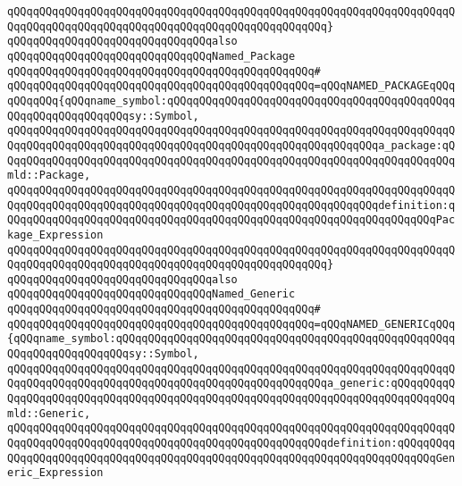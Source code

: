 \verb|qQQqqQQqqQQqqQQqqQQqqQQqqQQqqQQqqQQqqQQqqQQqqQQqqQQqqQQqqQQqqQQqqQQqqQQqqQQqqQQqqQQqqQQqqQQqqQQqqQQqqQQqqQQqqQQqqQQqqQQq}|\newline
\newline
\newline
\newline
\verb|qQQqqQQqqQQqqQQqqQQqqQQqqQQqqQQqalso|\newline
\verb|qQQqqQQqqQQqqQQqqQQqqQQqqQQqqQQqNamed_Package|\newline
\verb|qQQqqQQqqQQqqQQqqQQqqQQqqQQqqQQqqQQqqQQqqQQqqQQq#|\newline
\verb|qQQqqQQqqQQqqQQqqQQqqQQqqQQqqQQqqQQqqQQqqQQqqQQq=qQQqNAMED_PACKAGEqQQqqQQqqQQq{qQQqname_symbol:qQQqqQQqqQQqqQQqqQQqqQQqqQQqqQQqqQQqqQQqqQQqqQQqqQQqqQQqqQQqqQQqsy::Symbol,|\newline
\verb|qQQqqQQqqQQqqQQqqQQqqQQqqQQqqQQqqQQqqQQqqQQqqQQqqQQqqQQqqQQqqQQqqQQqqQQqqQQqqQQqqQQqqQQqqQQqqQQqqQQqqQQqqQQqqQQqqQQqqQQqqQQqqQQqa_package:qQQqqQQqqQQqqQQqqQQqqQQqqQQqqQQqqQQqqQQqqQQqqQQqqQQqqQQqqQQqqQQqqQQqqQQqmld::Package,|\newline
\verb|qQQqqQQqqQQqqQQqqQQqqQQqqQQqqQQqqQQqqQQqqQQqqQQqqQQqqQQqqQQqqQQqqQQqqQQqqQQqqQQqqQQqqQQqqQQqqQQqqQQqqQQqqQQqqQQqqQQqqQQqqQQqqQQqdefinition:qQQqqQQqqQQqqQQqqQQqqQQqqQQqqQQqqQQqqQQqqQQqqQQqqQQqqQQqqQQqqQQqqQQqPackage_Expression|\newline
\verb|qQQqqQQqqQQqqQQqqQQqqQQqqQQqqQQqqQQqqQQqqQQqqQQqqQQqqQQqqQQqqQQqqQQqqQQqqQQqqQQqqQQqqQQqqQQqqQQqqQQqqQQqqQQqqQQqqQQqqQQq}|\newline
\newline
\newline
\newline
\verb|qQQqqQQqqQQqqQQqqQQqqQQqqQQqqQQqalso|\newline
\verb|qQQqqQQqqQQqqQQqqQQqqQQqqQQqqQQqNamed_Generic|\newline
\verb|qQQqqQQqqQQqqQQqqQQqqQQqqQQqqQQqqQQqqQQqqQQqqQQq#|\newline
\verb|qQQqqQQqqQQqqQQqqQQqqQQqqQQqqQQqqQQqqQQqqQQqqQQq=qQQqNAMED_GENERICqQQq{qQQqname_symbol:qQQqqQQqqQQqqQQqqQQqqQQqqQQqqQQqqQQqqQQqqQQqqQQqqQQqqQQqqQQqqQQqqQQqqQQqsy::Symbol,|\newline
\verb|qQQqqQQqqQQqqQQqqQQqqQQqqQQqqQQqqQQqqQQqqQQqqQQqqQQqqQQqqQQqqQQqqQQqqQQqqQQqqQQqqQQqqQQqqQQqqQQqqQQqqQQqqQQqqQQqqQQqqQQqa_generic:qQQqqQQqqQQqqQQqqQQqqQQqqQQqqQQqqQQqqQQqqQQqqQQqqQQqqQQqqQQqqQQqqQQqqQQqqQQqqQQqmld::Generic,|\newline
\verb|qQQqqQQqqQQqqQQqqQQqqQQqqQQqqQQqqQQqqQQqqQQqqQQqqQQqqQQqqQQqqQQqqQQqqQQqqQQqqQQqqQQqqQQqqQQqqQQqqQQqqQQqqQQqqQQqqQQqqQQqdefinition:qQQqqQQqqQQqqQQqqQQqqQQqqQQqqQQqqQQqqQQqqQQqqQQqqQQqqQQqqQQqqQQqqQQqqQQqqQQqGeneric_Expression|\newline
